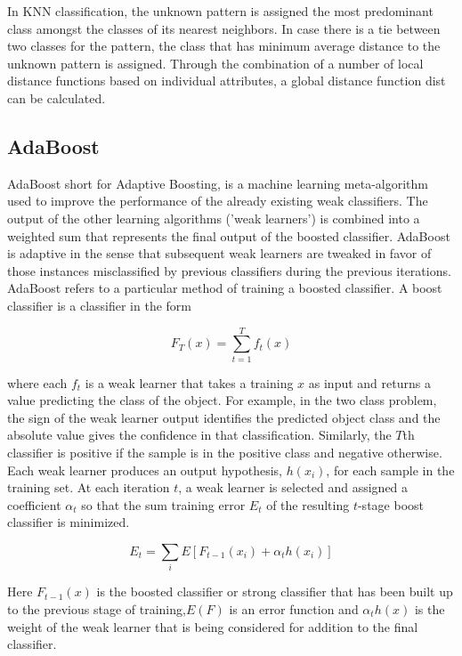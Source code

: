 \documentclass[letterpaper, 10 pt, conference]{ieeeconf}  %
\begin{document}
In  KNN  classification,  the  unknown  pattern  is assigned  the  most  predominant  class amongst  the  classes  of  its nearest neighbors. In case there is a tie between two classes for the pattern,  the  class  that  has  minimum  average  distance  to  the  unknown pattern is assigned. Through the combination of a number of local distance functions based on individual attributes, a global distance function dist can be calculated. 

\subsection{AdaBoost}

{AdaBoost} short for {Adaptive Boosting}, is a machine learning meta-algorithm used to improve the performance of the already existing weak classifiers. The output of the other learning algorithms ('weak learners') is combined into a weighted sum that represents the final output of the boosted classifier. AdaBoost is adaptive in the sense that subsequent weak learners are tweaked in favor of those instances misclassified by previous classifiers during the previous iterations.\\

AdaBoost refers to a particular method of training a boosted classifier. A boost classifier is a classifier in the form

    $$ F_T(x) = \sum_{t=1}^T f_t(x)$$

where each $f_{t}$ is a weak learner that takes a training $x$ as input and returns a value predicting the class of the object. For example, in the two class problem, the sign of the weak learner output identifies the predicted object class and the absolute value gives the confidence in that classification. Similarly, the $T$th classifier is positive if the sample is in the positive class and negative otherwise.\\

Each weak learner produces an output hypothesis, $h(x_i)$, for each sample in the training set. At each iteration $t$, a weak learner is selected and assigned a coefficient $\alpha_t$ so that the sum training error $E_{t}$ of the resulting $t$-stage boost classifier is minimized.

    $$E_t = \sum_i E[F_{t-1}(x_i) + \alpha_t h(x_i)]$$

Here $F_{t-1}(x)$ is the boosted classifier or strong classifier that has been built up to the previous stage of training,$E(F)$ is an error function and $\alpha_t h(x)$ is the weight of the weak learner that is being considered for addition to the final classifier. \\
\end{document}
